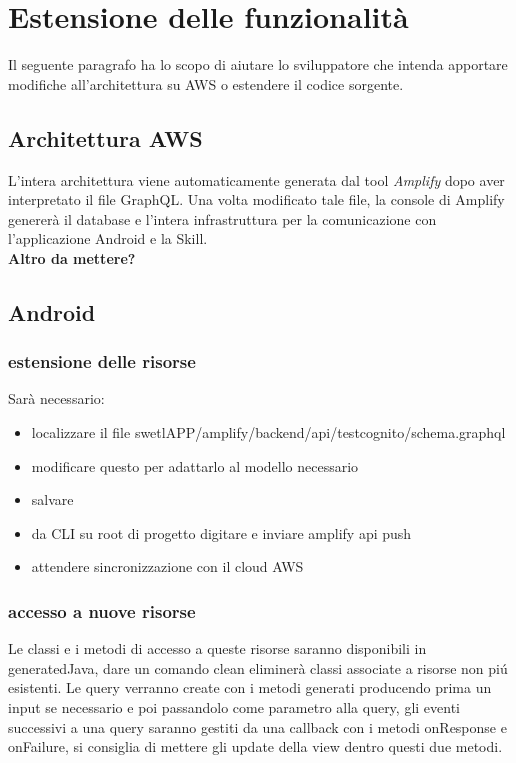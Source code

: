\clearpage

\section{Estensione delle funzionalità}

Il seguente paragrafo ha lo scopo di aiutare lo sviluppatore che intenda apportare modifiche all'architettura su AWS o estendere il codice sorgente.

\subsection{Architettura AWS}

L'intera architettura viene automaticamente generata dal tool \emph{Amplify} dopo aver interpretato il file GraphQL. Una volta modificato tale file, la console di Amplify genererà il database e l'intera infrastruttura per la comunicazione con l'applicazione Android e la Skill.\\[0.25cm]

\textbf{Altro da mettere?}

\subsection{Android}

\subsubsection{estensione delle risorse}
Sarà necessario:
\begin{itemize}

\item localizzare il file swetlAPP/amplify/backend/api/testcognito/schema.graphql
\item modificare questo per adattarlo al modello necessario
\item salvare
\item da CLI su root di progetto digitare e inviare amplify api push
\item attendere sincronizzazione con il cloud AWS
\end{itemize}

\subsubsection{accesso a nuove risorse}
Le classi e i metodi di accesso a queste risorse saranno disponibili in generatedJava, dare un comando clean eliminerà classi associate a risorse non piú esistenti. Le query verranno create con i metodi generati producendo prima un input se necessario e poi passandolo come parametro alla query, gli eventi successivi a una query saranno gestiti da una callback con i metodi onResponse e onFailure, si consiglia di mettere gli update della view dentro questi due metodi.

